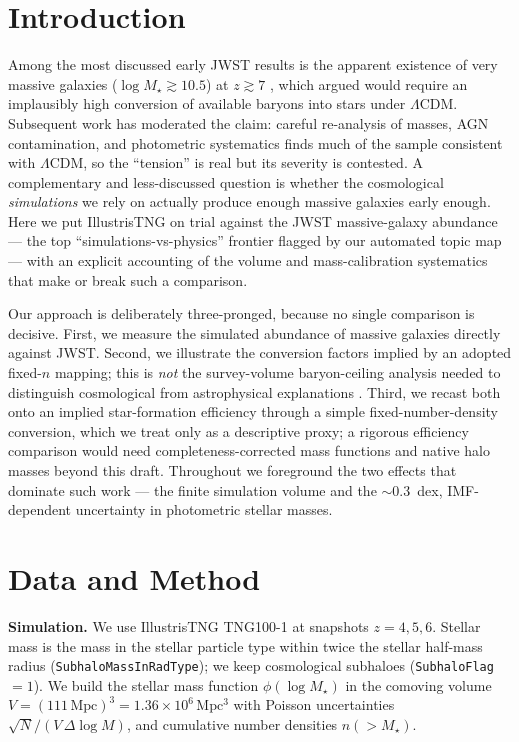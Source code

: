 \documentclass[twocolumn]{aastex631}
\begin{document}

\section{Introduction}
Among the most discussed early JWST results is the apparent existence of very massive galaxies ($\log M_\star\gtrsim10.5$) at $z\gtrsim7$ \citep{labbe23}, which \citet{boylankolchin23} argued would require an implausibly high conversion of available baryons into stars under $\Lambda$CDM. Subsequent work has moderated the claim: careful re-analysis of masses, AGN contamination, and photometric systematics \citep{chworowsky24} finds much of the sample consistent with $\Lambda$CDM, so the ``tension'' is real but its severity is contested. A complementary and less-discussed question is whether the cosmological \emph{simulations} we rely on actually produce enough massive galaxies early enough. Here we put IllustrisTNG on trial against the JWST massive-galaxy abundance --- the top ``simulations-vs-physics'' frontier flagged by our automated topic map --- with an explicit accounting of the volume and mass-calibration systematics that make or break such a comparison.

Our approach is deliberately three-pronged, because no single comparison is decisive. First, we measure the simulated abundance of massive galaxies directly against JWST. Second, we illustrate the conversion factors implied by an adopted fixed-$n$ mapping; this is \emph{not} the survey-volume baryon-ceiling analysis needed to distinguish cosmological from astrophysical explanations \citep{boylankolchin23}. Third, we recast both onto an implied star-formation efficiency through a simple fixed-number-density conversion, which we treat only as a descriptive proxy; a rigorous efficiency comparison would need completeness-corrected mass functions and native halo masses beyond this draft. Throughout we foreground the two effects that dominate such work --- the finite simulation volume and the $\sim0.3$~dex, IMF-dependent uncertainty in photometric stellar masses.

\section{Data and Method}
\textbf{Simulation.} We use IllustrisTNG TNG100-1 \citep{pillepich18,nelson19} at snapshots $z=4,5,6$. Stellar mass is the mass in the stellar particle type within twice the stellar half-mass radius (\texttt{SubhaloMassInRadType}); we keep cosmological subhaloes (\texttt{SubhaloFlag}$=1$). We build the stellar mass function $\phi(\log M_\star)$ in the comoving volume $V=(111\,\mathrm{Mpc})^3=1.36\times10^{6}\,\mathrm{Mpc^{3}}$ with Poisson uncertainties $\sqrt{N}/(V\,\Delta\log M)$, and cumulative number densities $n(>M_\star)$.
\end{document}
